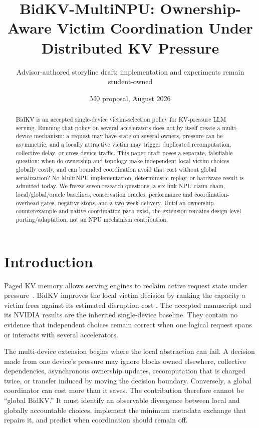 \documentclass[10pt]{article}
\title{BidKV-MultiNPU: Ownership-Aware Victim Coordination Under Distributed KV Pressure}
\author{Advisor-authored storyline draft; implementation and experiments remain student-owned}
\date{M0 proposal, August 2026}
\begin{document}
\maketitle
\begin{abstract}
BidKV is an accepted single-device victim-selection policy for KV-pressure LLM
serving.  Running that policy on several accelerators does not by itself create
a multi-device mechanism: a request may have state on several owners, pressure
can be asymmetric, and a locally attractive victim may trigger duplicated
recomputation, collective delay, or cross-device traffic.  This paper draft
poses a separate, falsifiable question: when do ownership and topology make
independent local victim choices globally costly, and can bounded coordination
avoid that cost without global serialization?  No MultiNPU implementation,
deterministic replay, or hardware result is admitted today.  We freeze seven
research questions, a six-link NPU claim chain, local/global/oracle baselines,
conservation oracles, performance and coordination-overhead gates, negative
stops, and a two-week delivery.  Until an ownership counterexample and native
coordination path exist, the extension remains design-level porting/adaptation,
not an NPU mechanism contribution.
\end{abstract}

\section{Introduction}
Paged KV memory allows serving engines to reclaim active request state under
pressure~\cite{Kwon2023}.  BidKV improves the local victim decision by ranking
the capacity a victim frees against its estimated disruption cost
\cite{BidKV2026}.  The accepted manuscript and its NVIDIA results are the
inherited single-device baseline.  They contain no evidence that independent
choices remain correct when one logical request spans or interacts with several
accelerators.

The multi-device extension begins where the local abstraction can fail.  A
decision made from one device's pressure may ignore blocks owned elsewhere,
collective dependencies, asynchronous ownership updates, recomputation that is
charged twice, or transfer induced by moving the decision boundary.  Conversely,
a global coordinator can cost more than it saves.  The contribution therefore
cannot be ``global BidKV.''  It must identify an observable divergence between
local and globally accountable choices, implement the minimum metadata exchange
that repairs it, and predict when coordination should remain off.
\end{document}
